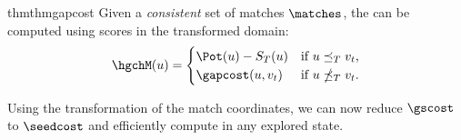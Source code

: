 \begin{restatable}{thm}{thmgapcost}\label{lem:gapcost}%
 Given a \emph{consistent} set of matches $\matches$, the \gch can be computed
 using scores in the transformed domain:
\begin{equation*}
  \hgchM(u) =
  \begin{cases}
    \Pot(u) - S_T(u) & \text{if $u\preceq_T v_t$,} \\
    \gapcost(u, v_t) & \text{if $u\npreceq_T v_t$.}
  \end{cases}
\end{equation*}
\end{restatable}

Using the transformation of the match coordinates, we can now reduce $\gscost$
to $\seedcost$ and efficiently compute \GCH in any explored state.
